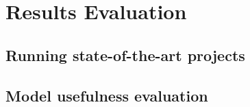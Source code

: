 
\chapter{Results Evaluation} \label{chap:results-evaluation}

\bt

\section{Running state-of-the-art projects} \label{sec:running-projects}

\bt

\section{Model usefulness evaluation} \label{sec:model-usefulness-evaluation}

\bt
